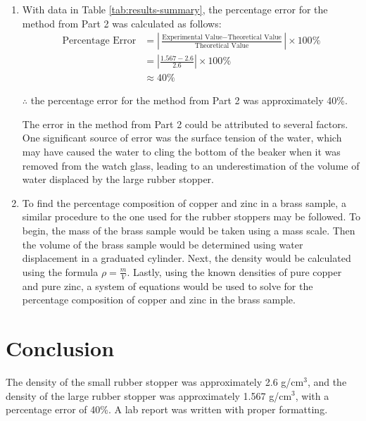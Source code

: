 \documentclass{article}
\begin{document}

\begin{enumerate}
    \item 
    With data in Table \ref{tab:results-summary}, the percentage error for the method from Part 2 was calculated as follows:
    \begin{align*}
        \text{Percentage Error} &= \left| \frac{\text{Experimental Value} - \text{Theoretical Value}}{\text{Theoretical Value}} \right| \times 100\% \\
        &= \left| \frac{1.567 - 2.6}{2.6} \right| \times 100\% \\
        &\approx 40\%
    \end{align*}
    
    $\therefore$ the percentage error for the method from Part 2 was approximately 40\%.

    The error in the method from Part 2 could be attributed to several factors. One significant source of error was the surface tension of the water, which may have caused the water to cling the bottom of the beaker when it was removed from the watch glass, leading to an underestimation of the volume of water displaced by the large rubber stopper. 
    
    \item 
    To find the percentage composition of copper and zinc in a brass sample, a similar procedure to the one used for the rubber stoppers may be followed. To begin, the mass of the brass sample would be taken using a mass scale. Then the volume of the brass sample would be determined using water displacement in a graduated cylinder. Next, the density would be calculated using the formula $\rho = \frac{m}{V}$. Lastly, using the known densities of pure copper and pure zinc, a system of equations would be used to solve for the percentage composition of copper and zinc in the brass sample.
\end{enumerate}
\section{Conclusion}
The density of the small rubber stopper was approximately 2.6 g/cm$^3$, and the density of the large rubber stopper was approximately 1.567 g/cm$^3$, with a percentage error of 40\%. A lab report was written with proper formatting.
\end{document}
